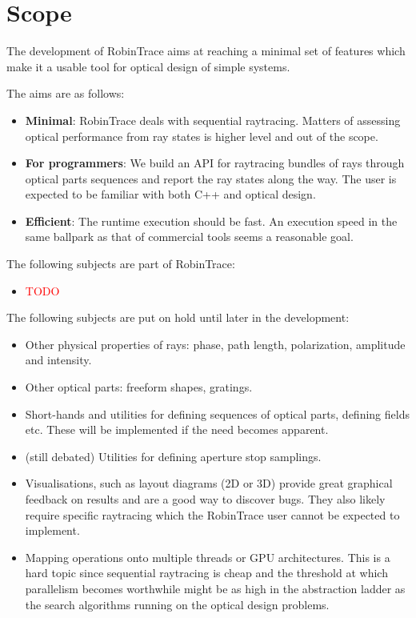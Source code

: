 \section{Scope}
The development of RobinTrace aims at reaching a minimal set of features which
make it a usable tool for optical design of simple systems.

The aims are as follows:
\begin{itemize}
\item \textbf{Minimal}: RobinTrace deals with sequential raytracing. Matters of
assessing optical performance from ray states is higher level and out of the
scope.
\item \textbf{For programmers}: We build an API for raytracing bundles of
rays through optical parts sequences and report the ray states along the way.
The user is expected to be familiar with both C++ and optical design.
\item \textbf{Efficient}: The runtime execution should be fast. An
execution speed in the same ballpark as that of commercial tools seems
a reasonable goal.
\end{itemize}

The following subjects are part of RobinTrace:
\begin{itemize}
\item \textcolor{red}{TODO}
\end{itemize}

The following subjects are put on hold until later in the development:
\begin{itemize}
\item Other physical properties of rays: phase, path length, polarization,
amplitude and intensity.
\item Other optical parts: freeform shapes, gratings.
\item Short-hands and utilities for defining sequences of optical parts,
defining fields etc. These will be implemented if the need becomes apparent.
\item (still debated) Utilities for defining aperture stop samplings.
\item Visualisations, such as layout diagrams (2D or 3D) provide great
graphical feedback on results and are a good way to discover bugs. They also
likely require specific raytracing which the RobinTrace user cannot be
expected to implement.
\item Mapping operations onto multiple threads or GPU architectures. This
is a hard topic since sequential raytracing is cheap and the threshold
at which parallelism becomes worthwhile might be as high in the abstraction
ladder as the search algorithms running on the optical design problems.
\end{itemize}

